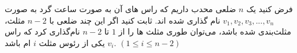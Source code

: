 \begin{PROBLEM}
	\p
	فرض کنید یک 
	$n$
	 ضلعی محدب داریم که راس های آن به صورت ساعت گرد به صورت
	$v_1, v_2, v_3, ..., v_n$
	نام گذاری شده اند. ثابت کنید اگر این چند ضلعی با 
	$n - 2$
	مثلث، مثلث‌بندی شده باشد، می‌توان طوری مثلث ها را از
	$1$
	تا 
	$n-2$
	نام‌گذاری کرد که راس
	$v_i$
	یکی از رئوس مثلث 
	$i$
	ام باشد.
	$(1 \leq i \leq n-2)$
	\SOLUTION{
		\p

	}
\end{PROBLEM}